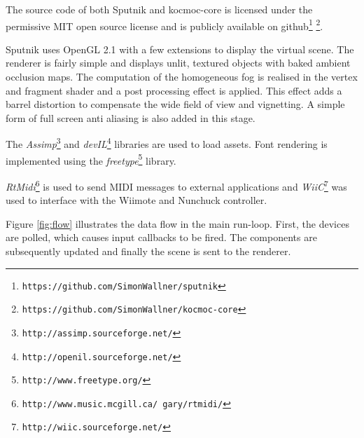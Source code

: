 \documentclass[10pt,a4paper]{scrartcl}
\begin{document}
The source code of both Sputnik and kocmoc-core is licensed under the permissive MIT open source license and is publicly available on github\footnote{\texttt{https://github.com/SimonWallner/sputnik}} \footnote{\texttt{https://github.com/SimonWallner/kocmoc-core}}.

Sputnik uses OpenGL 2.1 with a few extensions to display the virtual scene. The renderer is fairly simple and displays unlit, textured objects with baked ambient occlusion maps. The computation of the homogeneous fog is realised in the vertex and fragment shader and a post processing effect is applied. This effect adds a barrel distortion to compensate the wide field of view and vignetting. A simple form of full screen anti aliasing is also added in this stage.


The \emph{Assimp}\footnote{\texttt{http://assimp.sourceforge.net/}} and \emph{devIL}\footnote{\texttt{http://openil.sourceforge.net/}} libraries are used to load assets. Font rendering is implemented using the \emph{freetype}\footnote{\texttt{http://www.freetype.org/}} library.

\emph{RtMidi}\footnote{\texttt{http://www.music.mcgill.ca/~gary/rtmidi/}} is used to send MIDI messages to external applications and \emph{WiiC}\footnote{\texttt{http://wiic.sourceforge.net/}} was used to interface with the Wiimote and Nunchuck controller.

Figure \ref{fig:flow} illustrates the data flow in the main run-loop. First, the devices are polled, which causes input callbacks to be fired. The components are subsequently updated and finally the scene is sent to the renderer.
\end{document}

